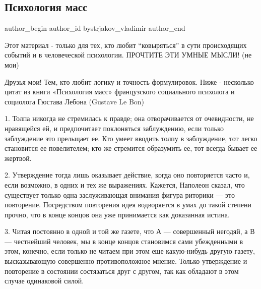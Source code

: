  
 
 
 
 
 
\subsection{Психология масс}
\label{sec:12_01_2021.fb.bystrjakov_vladimir.1.psihologia_tolpy}
 
\ifcmt
 author_begin
   author_id bystrjakov_vladimir
 author_end
\fi


Этот материал - только для тех, кто любит \enquote{ковыряться} в сути происходящих
событий и в человеческой психологии. ПРОЧТИТЕ ЭТИ УМНЫЕ МЫСЛИ! (не мои)

Друзья мои! Тем, кто любит логику и точность формулировок. Ниже - несколько
цитат из книги «Психология масс» французского социального психолога и социолога
Гюстава Лебона (Gustave Le Bon)

1. Толпа никогда не стремилась к правде; она отворачивается от очевидности, не
нравящейся ей, и предпочитает поклоняться заблуждению, если только заблуждение
это прельщает ее. Кто умеет вводить толпу в заблуждение, тот легко становится
ее повелителем; кто же стремится образумить ее, тот всегда бывает ее жертвой.

2. Утверждение тогда лишь оказывает действие, когда оно повторяется часто и,
если возможно, в одних и тех же выражениях. Кажется, Наполеон сказал, что
существует только одна заслуживающая внимания фигура риторики — это повторение.
Посредством повторения идея водворяется в умах до такой степени прочно, что в
конце концов она уже принимается как доказанная истина.

3. Читая постоянно в одной и той же газете, что А — совершенный негодяй, а В —
честнейший человек, мы в конце концов становимся сами убежденными в этом,
конечно, если только не читаем при этом еще какую-нибудь другую газету,
высказывающую совершенно противоположное мнение. Только утверждение и
повторение в состоянии состязаться друг с другом, так как обладают в этом
случае одинаковой силой.


